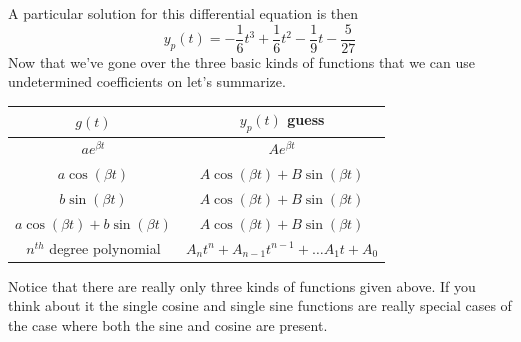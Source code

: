\documentclass[10pt,reqno]{book}
\theoremstyle{definition}
\begin{document}
	A particular solution for this differential equation is then
	\[ y_p(t) = -\frac{1}{6}t^3 + \frac{1}{6}t^2 - \frac{1}{9}t - \frac{5}{27} \]
	Now that we've gone over the three basic kinds of functions that we can use undetermined coefficients on let's summarize.
	\begin{center}
		\begin{tabular}{c|c}
			$ g(t) $ & $ y_p(t) $ guess \\ \hline
			$ a e^{\beta t} $ & $ A e^{\beta t} $\\
			$ a \cos(\beta t) $ & $ A \cos(\beta t) + B\sin(\beta t) $\\
			$ b \sin(\beta t) $ & $ A \cos(\beta t) + B\sin(\beta t) $\\
			$ a \cos(\beta t) + b \sin(\beta t) $ & $ A \cos(\beta t) + B\sin(\beta t) $\\
			$ n^{th} $ degree polynomial & $ A_n t^n + A_{n-1} t^{n-1} + \dots A_1 t + A_0 $
		\end{tabular}
	\end{center}
	Notice that there are really only three kinds of functions given above.  If you think about it the single cosine and single sine functions are really special cases of the case where both the sine and cosine are present.
\end{document}
